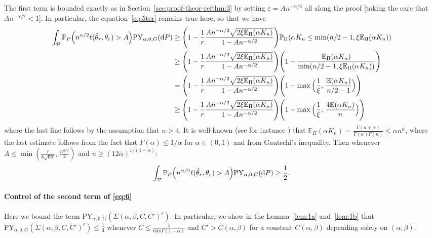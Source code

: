 \documentclass{article}
\newcommand{\1}{\boldsymbol{1}}
\newcommand{\EE}{\mathbb{E}}
\newcommand{\PP}{\mathbb{P}}
\theoremstyle{plain}
\begin{document}
The first term is bounded exactly as in Section~\ref{sec:proof-theor-refthm:3} by setting $\varepsilon = An^{-\alpha/2}$ all along the proof [taking the care that $An^{-\alpha/2} < 1$]. In particular, the equation~\eqref{eq:5ter} remains true here, so that we have
  \begin{align*}
    \int_{\mathcal{P}}\PP_P\Big(n^{\alpha/2}\ell(\hat{\theta}_r,\theta_r) > A \Big) \mathrm{PY}_{\alpha,0,G}(\intd P)%
    &\geq \Bigg(1 - \frac{1}{r}\frac{An^{-\alpha/2}\sqrt{2\xi \EE_{\Pi}(\alpha K_n)}}{1 - An^{-\alpha/2}} \Bigg)\PP_{\Pi}(\alpha K_n\leq \min(n/2-1,\xi \EE_{\Pi}(\alpha K_n))\\
    &\geq \Bigg(1 - \frac{1}{r}\frac{An^{-\alpha/2}\sqrt{2\xi \EE_{\Pi}(\alpha K_n)}}{1 - An^{-\alpha/2}} \Bigg)\Bigg(1 - \frac{\EE_{\Pi}(\alpha K_n)}{\min(n/2-1,\xi \EE_{\Pi}(\alpha K_n))}\Bigg)\\
    &= \Bigg(1 - \frac{1}{r}\frac{An^{-\alpha/2}\sqrt{2\xi \EE_{\Pi}(\alpha K_n)}}{1 - An^{-\alpha/2}} \Bigg)\Bigg(1 - \max\Big(\frac{1}{\xi},\, \frac{\EE(\alpha K_n)}{n/2-1}\Big)\Bigg)\\
    &\geq \Bigg(1 - \frac{1}{r}\frac{An^{-\alpha/2}\sqrt{2\xi \EE_{\Pi}(\alpha K_n)}}{1 - An^{-\alpha/2}} \Bigg)\Bigg(1 - \max\Big(\frac{1}{\xi},\, \frac{4\EE(\alpha K_n)}{n}\Big)\Bigg)
  \end{align*}
  where the last line follows by the assumption that $n\geq 4$. It is well-known (see for instance \cite[Exercise~3.2.9]{Pit(06)}) that $\EE_{\Pi}(\alpha K_n) = \frac{\Gamma(n+\alpha)}{\Gamma(\alpha)\Gamma(n)} \leq \alpha n^{\alpha}$, where the last estimate follows from the fact that $\Gamma(\alpha)\leq 1/\alpha$ for $\alpha \in (0,1)$ and from Gautschi's inequality. Then whenever $A \leq \min(\frac{r}{8\sqrt{6\alpha}},\, \frac{n^{\alpha/2}}{2})$ and $n \geq (12\alpha)^{1/(1-\alpha)}$:
  \begin{align}
    \label{eq:50:final}
    \int_{\mathcal{P}}\PP_P\Big(n^{\alpha/2}\ell(\hat{\theta}_r,\theta_r) > A \Big) \mathrm{PY}_{\alpha,0,G}(\intd P)%
    \geq \frac{1}{2}.
  \end{align}

\paragraph{Control of the second term of \eqref{eq:6}}

Here we bound the term $\mathrm{PY}_{\alpha,0,G}(\Sigma(\alpha,\beta,C,C')^c)$. In particular, we show in the Lemma~\ref{lem:1a} and~\ref{lem:1b} that $\mathrm{PY}_{\alpha,0,G}(\Sigma(\alpha,\beta,C,C')^c) \leq \frac{1}{4}$ whenever $C \leq \frac{1}{64\pi\Gamma(1-\alpha)}$ and $C' > C(\alpha,\beta)$ for a constant $C(\alpha,\beta)$ depending solely on $(\alpha,\beta)$.
\end{document}
